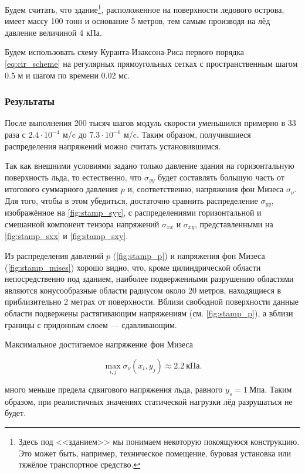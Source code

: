 Будем считать, что здание\footnote{Здесь под <<зданием>> мы понимаем некоторую покоящуюся конструкцию. Это может быть, например, техническое помещение, буровая установка или тяжёлое транспортное средство.}, расположенное на поверхности ледового острова, имеет массу 100 тонн и основание 5 метров, тем самым производя на лёд давление величиной 4 кПа.

Будем использовать схему Куранта-Изак\-сона-Риса первого порядка \eqref{eq:cir_scheme} на регулярных прямоугольных сетках с пространственным шагом 0.5 м и шагом по времени 0.02 мс. 

\subsubsection{Результаты}

После выполнения 200 тысяч шагов модуль скорости уменьшился примерно в 33 раза с $2.4\cdot10^{-4}$ м/c до $7.3\cdot10^{-6}$ м/c. Таким образом, получившиеся распределения напряжений можно считать установившимся.

Так как внешними условиями задано только давление здания на горизонтальную поверхность льда, то естественно, что $\sigma_{yy}$ будет составлять большую часть от итогового суммарного давления $p$ и, соответственно, напряжения фон Мизеса $\sigma_\nu$. Для того, чтобы в этом убедиться, достаточно сравнить распределение $\sigma_{yy}$, изображённое на \autoref{fig:stamp_syy}, с распределениями горизонтальной и смешанной компонент тензора напряжений $\sigma_{xx}$ и $\sigma_{xy}$, представленными на \autoref{fig:stamp_sxx} и \autoref{fig:stamp_sxy}.

Из распределения давлений $p$ (\autoref{fig:stamp_p}) и напряжения фон Мизеса (\autoref{fig:stamp_mises}) хорошо видно, что, кроме цилиндрической области непосредственно под зданием, наиболее подверженными разрушению областями являются конусообразные области радиусом около 20 метров, находящиеся в приблизительно 2 метрах от поверхности. Вблизи свободной поверхности данные области подвержены растягивающим напряжениям (см. \autoref{fig:stamp_p}), а вблизи границы с придонным слоем --- сдавливающим.

Максимальное достигаемое напряжение фон Мизеса 

\begin{equation*}
    \max_{i,j} \sigma_\nu\left(x_i, y_j\right) \approx 2.2~ \text{кПа} .
\end{equation*}

\noindent много меньше предела сдвигового напряжения льда, равного $y_s = 1~\text{Мпа}$. Таким образом, при реалистичных значениях статической нагрузки лёд разрушаться не будет.

